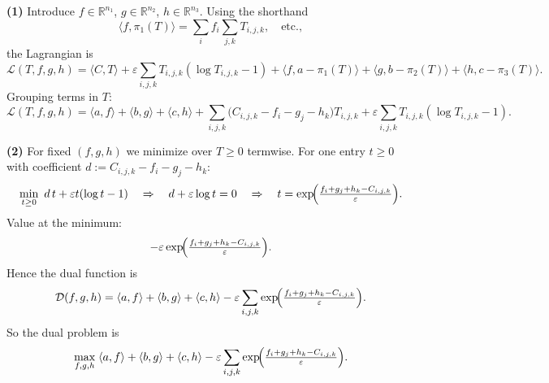 \documentclass[11pt,a4paper]{article}
\theoremstyle{exostyle}
\newcommand{\R}{\mathbb{R}}
\newcommand{\ip}[2]{\langle #1,#2\rangle}
\begin{document}
\begin{solution}
\textbf{(1)} Introduce $f\in\R^{n_1}$, $g\in\R^{n_2}$, $h\in\R^{n_3}$. Using the shorthand
\[
\ip{f}{\pi_1(T)} = \sum_{i} f_i \sum_{j,k} T_{i,j,k},\quad\text{etc.},
\]
the Lagrangian is
\[
\mathcal L(T,f,g,h)
= \ip{C}{T} + \varepsilon \sum_{i,j,k} T_{i,j,k}(\log T_{i,j,k} -1)
+ \ip{f}{a - \pi_1(T)} + \ip{g}{b - \pi_2(T)} + \ip{h}{c - \pi_3(T)}.
\]
Grouping terms in $T$:
\[
\mathcal L(T,f,g,h)
= \ip{a}{f} + \ip{b}{g} + \ip{c}{h}
+ \sum_{i,j,k} \bigl(C_{i,j,k} - f_i - g_j - h_k\bigr) T_{i,j,k}
+ \varepsilon \sum_{i,j,k} T_{i,j,k}(\log T_{i,j,k} -1).
\]

\medskip
\textbf{(2)} For fixed $(f,g,h)$ we minimize over $T\ge0$ termwise. For one entry $t\ge0$ with coefficient $d:=C_{i,j,k} - f_i - g_j - h_k$:
\[
\min_{t\ge0} \ d\,t + \varepsilon t(\log t -1)
\quad\Rightarrow\quad
d + \varepsilon \log t = 0
\quad\Rightarrow\quad
t = \exp\!\Bigl( \tfrac{f_i + g_j + h_k - C_{i,j,k}}{\varepsilon} \Bigr).
\]
Value at the minimum:
\[
-\varepsilon \exp\!\Bigl( \tfrac{f_i + g_j + h_k - C_{i,j,k}}{\varepsilon} \Bigr).
\]
Hence the dual function is
\[
\mathcal D(f,g,h)
= \ip{a}{f} + \ip{b}{g} + \ip{c}{h}
- \varepsilon \sum_{i,j,k} \exp\!\Bigl( \tfrac{f_i + g_j + h_k - C_{i,j,k}}{\varepsilon} \Bigr).
\]
So the dual problem is
\[
\max_{f,g,h}\;
\ip{a}{f} + \ip{b}{g} + \ip{c}{h}
- \varepsilon \sum_{i,j,k} \exp\!\Bigl( \tfrac{f_i + g_j + h_k - C_{i,j,k}}{\varepsilon} \Bigr).
\]


\end{solution}
\end{document}

